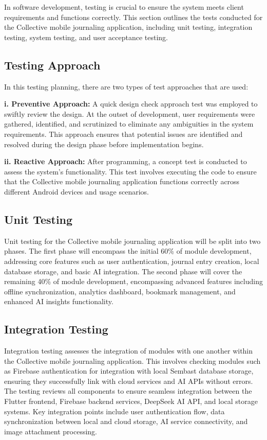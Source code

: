 In software development, testing is crucial to ensure the system meets client requirements and functions correctly. This section outlines the tests conducted for the Collective mobile journaling application, including unit testing, integration testing, system testing, and user acceptance testing.

\subsection{Testing Approach}\label{sec:testingApproach}

In this testing planning, there are two types of test approaches that are used:

\textbf{i. Preventive Approach:} A quick design check approach test was employed to swiftly review the design. At the outset of development, user requirements were gathered, identified, and scrutinized to eliminate any ambiguities in the system requirements. This approach ensures that potential issues are identified and resolved during the design phase before implementation begins.

\textbf{ii. Reactive Approach:} After programming, a concept test is conducted to assess the system's functionality. This test involves executing the code to ensure that the Collective mobile journaling application functions correctly across different Android devices and usage scenarios.

\subsection{Unit Testing}\label{sec:unitTesting}

Unit testing for the Collective mobile journaling application will be split into two phases. The first phase will encompass the initial 60\% of module development, addressing core features such as user authentication, journal entry creation, local database storage, and basic AI integration. The second phase will cover the remaining 40\% of module development, encompassing advanced features including offline synchronization, analytics dashboard, bookmark management, and enhanced AI insights functionality.

\subsection{Integration Testing}\label{sec:integrationTesting}

Integration testing assesses the integration of modules with one another within the Collective mobile journaling application. This involves checking modules such as Firebase authentication for integration with local Sembast database storage, ensuring they successfully link with cloud services and AI APIs without errors. The testing reviews all components to ensure seamless integration between the Flutter frontend, Firebase backend services, DeepSeek AI API, and local storage systems. Key integration points include user authentication flow, data synchronization between local and cloud storage, AI service connectivity, and image attachment processing.


